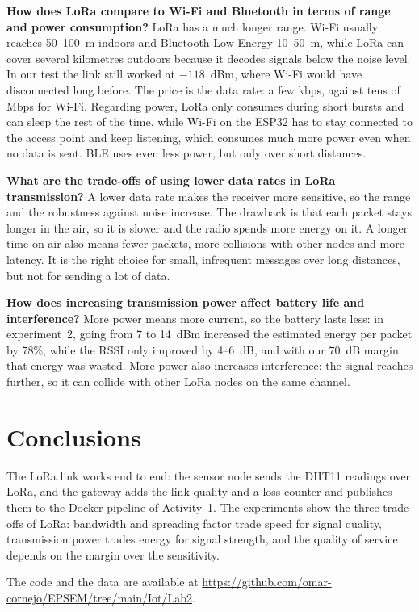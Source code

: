 \documentclass[11pt,a4paper]{article}
\begin{document}
\textbf{How does LoRa compare to Wi-Fi and Bluetooth in terms of range and power
consumption?}
LoRa has a much longer range. Wi-Fi usually reaches 50--100~m indoors and Bluetooth Low
Energy 10--50~m, while LoRa can cover several kilometres outdoors because it decodes signals
below the noise level. In our test the link still worked at $-118$~dBm, where Wi-Fi would
have disconnected long before. The price is the data rate: a few kbps, against tens of Mbps
for Wi-Fi. Regarding power, LoRa only consumes during short
bursts and can sleep the rest of the time, while Wi-Fi on the
ESP32 has to stay connected to the access point and keep listening, which consumes much more
power even when no data is sent.
BLE uses even less power, but only over short distances.

\textbf{What are the trade-offs of using lower data rates in LoRa transmission?}
A lower data rate makes the receiver more sensitive, so the
range and the robustness against noise increase. The drawback is that each packet stays
longer in the air, so it is slower and the radio spends more energy on it. A longer time on air also means fewer packets,
more collisions with other nodes and more latency. It is the right choice for small,
infrequent messages over long distances, but not for sending a lot of data.

\textbf{How does increasing transmission power affect battery life and interference?}
More power means more current, so the battery lasts less: in experiment~2, going from 7 to
14~dBm increased the estimated energy per packet by 78\%, while the RSSI only improved by 4--6~dB, and
with our 70~dB margin that energy was wasted. More power also increases interference: the
signal reaches further, so it can collide with other LoRa nodes on the same channel.

\section{Conclusions}
\label{sec:conclusions}

The LoRa link works end to end: the sensor node sends the DHT11 readings over LoRa, and the
gateway adds the link quality and a loss counter and publishes them to the Docker pipeline of
Activity~1. The experiments show the three trade-offs of
LoRa: bandwidth and spreading factor trade speed for signal quality,
transmission power trades energy for signal strength, and the quality of service depends on the margin over the sensitivity.

The code and the data are available at \url{https://github.com/omar-cornejo/EPSEM/tree/main/Iot/Lab2}.
\end{document}
